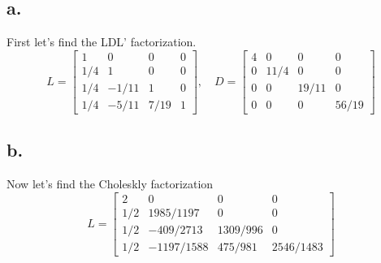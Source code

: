 \documentclass{article}
\begin{document}
\subsection*{a.}
First let's find the LDL' factorization.
\[
L=
\begin{bmatrix}
  1  &  0  &  0  & 0\\
  1/4&  1  &  0  & 0\\
  1/4&-1/11&  1  & 0\\
  1/4&-5/11&7/19 & 1
\end{bmatrix}
, \quad
D=
\begin{bmatrix}
  4  &  0  &  0  &  0\\
  0  &11/4 &  0  &  0\\
  0  &  0  &19/11&  0\\
  0  &  0  &  0  &56/19
\end{bmatrix}
\]
\subsection*{b.}
Now let's find the Choleskly factorization
\[
L=
\begin{bmatrix}
  2  & 0         & 0       & 0\\
  1/2& 1985/1197 & 0       & 0\\
  1/2& -409/2713 & 1309/996& 0\\
  1/2& -1197/1588& 475/981 & 2546/1483
\end{bmatrix}
\]
\end{document}
